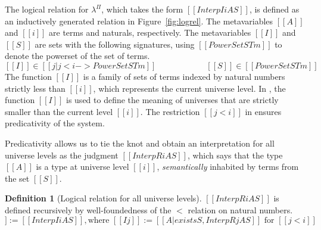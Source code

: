 \documentclass[\ifpublic nolinenum\else\fi,online,OA]{jfp}
\newcommand{\scw}[1]{}
\newcommand{\yl}[1]{}
\newcommand{\lang}{$\lambda^{\Pi}$\xspace}
\theoremstyle{definition}
\newtheorem{definition}[theorem]{Definition}
\begin{document}
The logical relation for \lang{}, which takes the form $[[Interp I i A
S]]$, is defined as an inductively generated relation in Figure~\ref{fig:logrel}.
The metavariables $[[A]]$ and $[[i]]$ are terms and naturals, respectively.
The metavariables $[[I]]$ and $[[S]]$ are
sets with the following signatures,
using $[[PowerSet STm]]$ to denote the powerset of the set of terms.
\[
    [[I]] \in [[ { j | j < i  } ->  PowerSet STm ]] \qquad\qquad\qquad
    [[S]] \in [[PowerSet STm]]
\]
The function $[[I]]$ is a family of sets of terms indexed by natural numbers
strictly less than $[[i]]$, which represents the current universe level.
In , the function $[[I]]$ is used to define the meaning of
universes that are strictly smaller than the current level $[[i]]$. The
restriction $[[j < i]]$ in  ensures predicativity of the system.

Predicativity allows us to tie the knot and obtain an interpretation for all
universe levels as the judgment $[[InterpR i A S]]$, which says that the type
$[[A]]$ is a type at universe level $[[i]]$, \emph{semantically} inhabited by
terms from the set $[[S]]$.

\begin{definition}[Logical relation for all universe levels]
\label{fig:logrelrec}
$[[InterpR i A S]]$ is defined recursively by well-foundedness of the $<$
relation on natural numbers.
\begin{equation*}
    [[InterpR i A S]] := [[ Interp I i A S  ]], \text{where } [[I j]]
    := [[{A | exists S , InterpR j A S}]] \text{ for } [[j < i]]
\end{equation*}
\end{definition}
\end{document}
